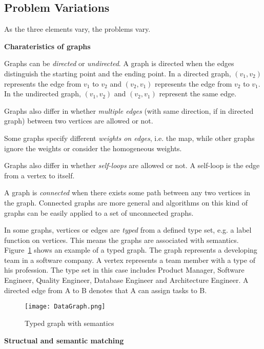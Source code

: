 \subsection{Problem Variations}

As the three elements vary, the problems vary.

\textbf{Charateristics of graphs}

Graphs can be \textit{directed} or \textit{undirected}. A graph is directed when the edges distinguish the starting point and the ending point. In a directed graph, $(v_1,v_2)$ represents the edge from $v_1$ to $v_2$ and $(v_2,v_1)$ represents the edge from $v_2$ to $v_1$. In the undirected graph, $(v_1,v_2)$ and $(v_2,v_1)$ represent the same edge.

Graphs also differ in whether \textit{multiple edges} (with same direction, if in directed graph) between two vertices are allowed or not.

Some graphs specify different \textit{weights on edges}, i.e. the map, while other graphs ignore the weights or consider the homogeneous weights.

Graphs also differ in whether \textit{self-loops} are allowed or not. A self-loop is the edge from a vertex to itself.

A graph is \textit{connected} when there exists some path between any two vertices in the graph. Connected graphs are more general and algorithms on this kind of graphs can be easily applied to a set of unconnected graphs.

In some graphs, vertices or edges are \textit{typed} from a defined type set, e.g. a label function on vertices. This means the graphs are associated with semantics. Figure~\ref{fig:TypedDataGraphExample} shows an example of a typed graph. The graph represents a developing team in a software company. A vertex represents a team member with a type of his profession. The type set in this case includes Product Manager, Software Engineer, Quality Engineer, Database Engineer and Architecture Engineer. A directed edge from A to B denotes that A can assign tasks to B.

\begin{figure}[H]
  \begin{center}
    \texttt{[image: DataGraph.png]}
    \caption{Typed graph with semantics}
    \label{fig:TypedDataGraphExample}
  \end{center}
\end{figure}

\textbf{Structual and semantic matching}

